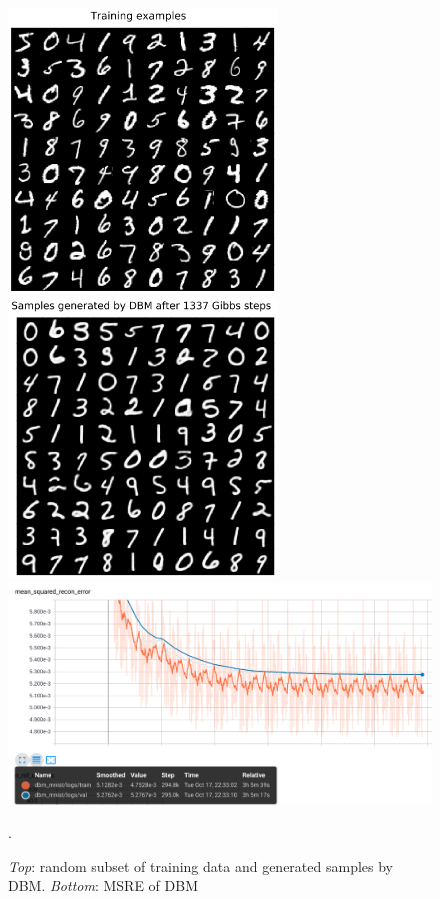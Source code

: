 \clearpage
\begin{figure}[h]
\begin{mdframed}
\centering
\includegraphics[width=2.8in]{dbm-mnist-latest/mnist.png}
\quad
\includegraphics[width=2.8in]{dbm-mnist-latest/samples.png}
\\[2em]
\includegraphics[width=5.6in]{dbm-mnist-latest/msre.png}
\caption{\emph{Top}: random subset of training data and generated samples by DBM. \emph{Bottom}: MSRE of DBM}.
\end{mdframed}
\end{figure}

